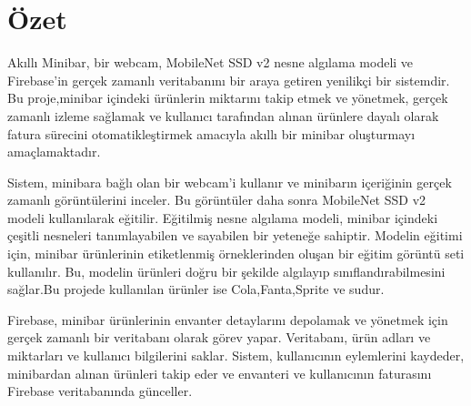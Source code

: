 \chapter*{Özet}

Akıllı Minibar, bir webcam, MobileNet SSD v2 nesne algılama modeli ve Firebase'in gerçek zamanlı veritabanını bir araya getiren yenilikçi bir sistemdir. Bu proje,minibar içindeki ürünlerin miktarını takip etmek ve yönetmek, gerçek zamanlı izleme sağlamak ve kullanıcı tarafından alınan ürünlere dayalı olarak fatura sürecini otomatikleştirmek amacıyla akıllı bir minibar oluşturmayı amaçlamaktadır.

Sistem, minibara bağlı olan bir webcam'i kullanır ve minibarın içeriğinin gerçek zamanlı görüntülerini inceler. Bu görüntüler daha sonra MobileNet SSD v2 modeli kullanılarak eğitilir. Eğitilmiş nesne algılama modeli, minibar içindeki çeşitli nesneleri tanımlayabilen ve sayabilen bir yeteneğe sahiptir. Modelin eğitimi için, minibar ürünlerinin etiketlenmiş örneklerinden oluşan bir eğitim görüntü seti kullanılır. Bu, modelin ürünleri doğru bir şekilde algılayıp sınıflandırabilmesini sağlar.Bu projede kullanılan ürünler ise Cola,Fanta,Sprite ve sudur.

Firebase, minibar ürünlerinin envanter detaylarını depolamak ve yönetmek için gerçek zamanlı bir veritabanı olarak görev yapar. Veritabanı, ürün adları ve miktarları ve kullanıcı bilgilerini saklar. Sistem, kullanıcının eylemlerini kaydeder, minibardan alınan ürünleri takip eder ve envanteri ve kullanıcının faturasını Firebase veritabanında günceller.

\vfill
\clearpage